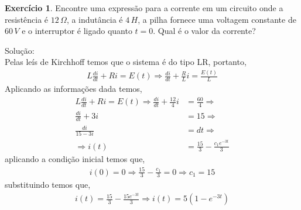 \documentclass[a4paper,12pt,reqno,natbib]{amsart}
\theoremstyle{definition}
\newtheorem{exercise}{Exerc\'icio}
\begin{document}
\vspace{0.6 cm}

\begin{exercise}
Encontre uma expressão para a corrente em um circuito onde a resistência é $12\,\Omega$, a indutância é $4\,H$, a pilha fornece uma voltagem constante de $60\,V$ e o interruptor é ligado quanto $t = 0$. Qual é o valor da corrente?
\end{exercise}
Solu\c c\~ao:\\
Pelas le\'is de Kirchhoff temos que o sistema \'e do tipo LR, portanto,
\begin{align*}
	L\frac{di}{dt} + Ri = E(t) \Rightarrow \frac{di}{dt} + \frac{R}{L}i = \frac{E(t)}{L}
\end{align*}
Aplicando as informa\c c\~oes dada temos,
\begin{align*}
	L\frac{di}{dt} + Ri = E(t) \Rightarrow \frac{di}{dt} + \frac{12}{4}i &= \frac{60}{4} \Rightarrow \\
	\frac{di}{dt} + 3i &= 15 \Rightarrow\\
	\frac{di}{15-3i} &= dt \Rightarrow \\
	\Rightarrow i(t) &= \frac{15}{3} -\frac{c_1e^{-3t}}{3}
\end{align*}
aplicando a condi\c c\~ao inicial temos que,
\begin{align*}
	i(0) = 0 \Rightarrow \frac{15}{3} - \frac{c_1}{3} = 0 \Rightarrow c_1 = 15
\end{align*}
substituindo temos que,
\begin{align*}
	i(t) = \frac{15}{3} -\frac{15e^{-3t}}{3} \Rightarrow i(t) = 5(1 - e^{-3t})
\end{align*}
\vspace{0.6 cm}
\end{document}
